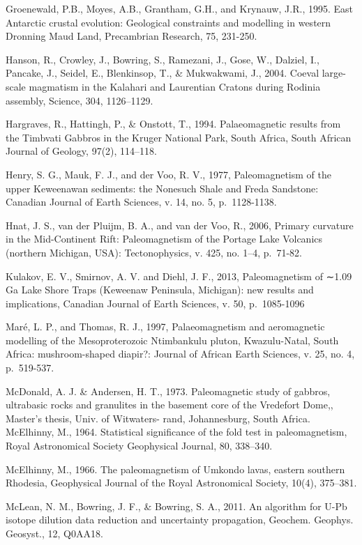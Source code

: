 \documentclass{article}
\begin{document}
Groenewald, P.B., Moyes, A.B., Grantham, G.H., and Krynauw, J.R., 1995.
East Antarctic crustal evolution: Geological constraints and modelling
in western Dronning Maud Land, Precambrian Research, 75, 231-250.

Hanson, R., Crowley, J., Bowring, S., Ramezani, J., Gose, W., Dalziel,
I., Pancake, J., Seidel, E., Blenkinsop, T., \& Mukwakwami, J., 2004.
Coeval large-scale magmatism in the Kalahari and Laurentian Cratons
during Rodinia assembly, Science, 304, 1126--1129.

Hargraves, R., Hattingh, P., \& Onstott, T., 1994. Palaeomagnetic
results from the Timbvati Gabbros in the Kruger National Park, South
Africa, South African Journal of Geology, 97(2), 114--118.

Henry, S. G., Mauk, F. J., and der Voo, R. V., 1977, Paleomagnetism of
the upper Keweenawan sediments: the Nonesuch Shale and Freda Sandstone:
Canadian Journal of Earth Sciences, v. 14, no. 5, p.~1128-1138.

Hnat, J. S., van der Pluijm, B. A., and van der Voo, R., 2006, Primary
curvature in the Mid-Continent Rift: Paleomagnetism of the Portage Lake
Volcanics (northern Michigan, USA): Tectonophysics, v. 425, no. 1--4,
p.~71-82.

Kulakov, E. V., Smirnov, A. V. and Diehl, J. F., 2013, Paleomagnetism of
∼1.09 Ga Lake Shore Traps (Keweenaw Peninsula, Michigan): new results
and implications, Canadian Journal of Earth Sciences, v. 50,
p.~1085-1096

Maré, L. P., and Thomas, R. J., 1997, Palaeomagnetism and aeromagnetic
modelling of the Mesoproterozoic Ntimbankulu pluton, Kwazulu-Natal,
South Africa: mushroom-shaped diapir?: Journal of African Earth
Sciences, v. 25, no. 4, p.~519-537.

McDonald, A. J. \& Andersen, H. T., 1973. Paleomagnetic study of
gabbros, ultrabasic rocks and granulites in the basement core of the
Vredefort Dome,, Master's thesis, Univ. of Witwaters- rand,
Johannesburg, South Africa. McElhinny, M., 1964. Statistical
significance of the fold test in paleomagnetism, Royal Astronomical
Society Geophysical Journal, 80, 338--340.

McElhinny, M., 1966. The paleomagnetism of Umkondo lavas, eastern
southern Rhodesia, Geophysical Journal of the Royal Astronomical
Society, 10(4), 375--381.

McLean, N. M., Bowring, J. F., \& Bowring, S. A., 2011. An algorithm for
U-Pb isotope dilution data reduction and uncertainty propagation,
Geochem. Geophys. Geosyst., 12, Q0AA18.
\end{document}
